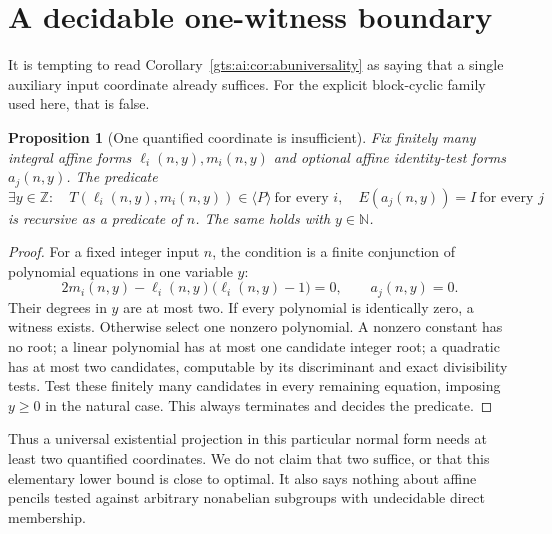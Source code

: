 \documentclass[11pt,letterpaper]{article}
\newtheorem{proposition}[theorem]{Proposition}
\theoremstyle{definition}
\theoremstyle{remark}
\newcommand{\Z}{\mathbb Z}
\newcommand{\N}{\mathbb N}
\begin{document}
\section{A decidable one-witness boundary}\label{gts:ai:sec:onewitness}
It is tempting to read Corollary~\ref{gts:ai:cor:abuniversality} as saying that a single auxiliary input coordinate already suffices. For the explicit block-cyclic family used here, that is false.

\begin{proposition}[One quantified coordinate is insufficient]\label{gts:ai:prop:onewitness}
Fix finitely many integral affine forms $\ell_i(n,y),m_i(n,y)$ and optional affine identity-test forms $a_j(n,y)$. The predicate
\[
 \exists y\in\Z:\quad
 T(\ell_i(n,y),m_i(n,y))\in\langle P\rangle\ \text{for every }i,
 \quad E(a_j(n,y))=I\ \text{for every }j
\]
is recursive as a predicate of $n$. The same holds with $y\in\N$.
\end{proposition}
\begin{proof}
For a fixed integer input $n$, the condition is a finite conjunction of polynomial equations in one variable $y$:
\[
 2m_i(n,y)-\ell_i(n,y)\bigl(\ell_i(n,y)-1\bigr)=0,
 \qquad a_j(n,y)=0.
\]
Their degrees in $y$ are at most two. If every polynomial is identically zero, a witness exists. Otherwise select one nonzero polynomial. A nonzero constant has no root; a linear polynomial has at most one candidate integer root; a quadratic has at most two candidates, computable by its discriminant and exact divisibility tests. Test these finitely many candidates in every remaining equation, imposing $y\ge0$ in the natural case. This always terminates and decides the predicate.
\end{proof}
Thus a universal existential projection in this particular normal form needs at least two quantified coordinates. We do not claim that two suffice, or that this elementary lower bound is close to optimal. It also says nothing about affine pencils tested against arbitrary nonabelian subgroups with undecidable direct membership.
\end{document}

